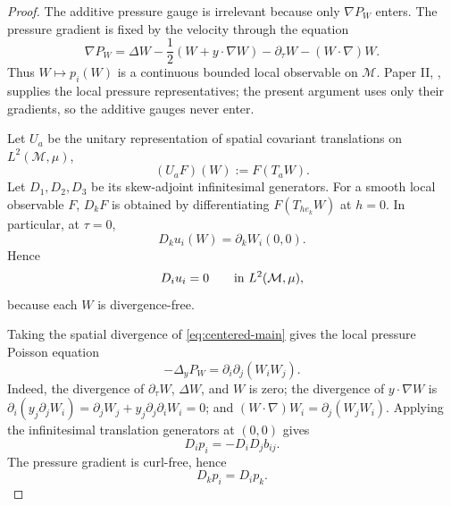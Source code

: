 \documentclass[11pt]{amsart}
\numberwithin{equation}{section}
\theoremstyle{plain}
\theoremstyle{definition}
\theoremstyle{remark}
\newcommand{\calM}{\mathcal M}
\begin{document}
\begin{proof}
The additive pressure gauge is irrelevant because only \(\nabla P_W\) enters.
The pressure gradient is fixed by the velocity through the equation
\[
   \nabla P_W
   =
   \Delta W-\frac12(W+y\cdot\nabla W)
   -\partial_\tau W-(W\cdot\nabla)W .
\]
Thus \(W\mapsto p_i(W)\) is a continuous bounded local observable on
\(\calM\).  Paper II, \cite[Lemma~\emph{Local pressure reconstruction}]
{DuranPaperII}, supplies the local pressure representatives; the present
argument uses only their gradients, so the additive gauges never enter.

Let \(U_a\) be the unitary representation of spatial covariant translations
on \(L^2(\calM,\mu)\),
\[
   (U_aF)(W):=F(T_aW).
\]
Let \(D_1,D_2,D_3\) be its skew-adjoint infinitesimal generators.  For a smooth
local observable \(F\), \(D_kF\) is obtained by differentiating
\(F(T_{he_k}W)\) at \(h=0\).  In particular, at \(\tau=0\),
\[
   D_k u_i(W)=\partial_kW_i(0,0).
\]
Hence
\begin{equation}\label{eq:state-div-free}
   D_i u_i=0
   \qquad\hbox{in }L^2(\calM,\mu),
\end{equation}
because each \(W\) is divergence-free.

Taking the spatial divergence of \eqref{eq:centered-main} gives the local
pressure Poisson equation
\begin{equation}\label{eq:local-pressure-poisson-core}
   -\Delta_yP_W=\partial_i\partial_j(W_iW_j).
\end{equation}
Indeed, the divergence of \(\partial_\tau W\), \(\Delta W\), and \(W\) is
zero; the divergence of \(y\cdot\nabla W\) is
\(\partial_i(y_j\partial_jW_i)=\partial_jW_j+y_j\partial_j\partial_iW_i=0\);
and \((W\cdot\nabla)W_i=\partial_j(W_jW_i)\).  Applying the infinitesimal
translation generators at \((0,0)\) gives
\begin{equation}\label{eq:state-pressure-divergence}
   D_i p_i=-D_iD_jb_{ij}.
\end{equation}
The pressure gradient is curl-free, hence
\begin{equation}\label{eq:state-pressure-curl}
   D_kp_i=D_ip_k .
\end{equation}


\end{proof}
\end{document}
